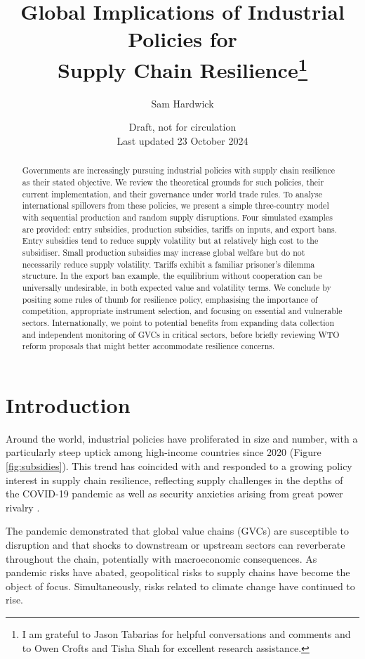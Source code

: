 \documentclass{article}
\title{Global Implications of Industrial Policies for \\ Supply Chain Resilience\thanks{I am grateful to Jason Tabarias for helpful conversations and comments and to Owen Crofts and Tisha Shah for excellent research assistance.}}
\author{Sam Hardwick}
\date{Draft, not for circulation \\ Last updated 23 October 2024}
\begin{document}
\maketitle
\begin{abstract}
    Governments are increasingly pursuing industrial policies with supply chain resilience as their stated objective. We review the theoretical grounds for such policies, their current implementation, and their governance under world trade rules. To analyse international spillovers from these policies, we present a simple three-country model with sequential production and random supply disruptions. Four simulated examples are provided: entry subsidies, production subsidies, tariffs on inputs, and export bans. Entry subsidies tend to reduce supply volatility but at relatively high cost to the subsidiser. Small production subsidies may increase global welfare but do not necessarily reduce supply volatility. Tariffs exhibit a familiar prisoner's dilemma structure. In the export ban example, the equilibrium without cooperation can be universally undesirable, in both expected value and volatility terms. We conclude by positing some rules of thumb for resilience policy, emphasising the importance of competition, appropriate instrument selection, and focusing on essential and vulnerable sectors. Internationally, we point to potential benefits from expanding data collection and independent monitoring of GVCs in critical sectors, before briefly reviewing WTO reform proposals that might better accommodate resilience concerns.
\end{abstract}

\section{Introduction}

Around the world, industrial policies have proliferated in size and number, with a particularly steep uptick among high-income countries since 2020 (Figure \ref{fig:subsidies}). This trend has coincided with and responded to a growing policy interest in supply chain resilience, reflecting supply challenges in the depths of the COVID-19 pandemic as well as security anxieties arising from great power rivalry \parencite{ilyina_industrial_2024}.

The pandemic demonstrated that global value chains (GVCs) are susceptible to disruption and that shocks to downstream or upstream sectors can reverberate throughout the chain, potentially with macroeconomic consequences. As pandemic risks have abated, geopolitical risks to supply chains have become the object of focus. Simultaneously, risks related to climate change have continued to rise.
\end{document}
